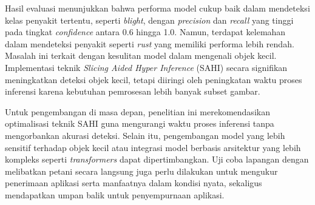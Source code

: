 \documentclass[journal,article,submit,pdftex,moreauthors]{Definitions/mdpi}
\begin{document}
Hasil evaluasi menunjukkan bahwa performa model cukup baik dalam mendeteksi kelas penyakit tertentu, seperti \textit{blight}, dengan \textit{precision} dan \textit{recall} yang tinggi pada tingkat \textit{confidence} antara 0.6 hingga 1.0. Namun, terdapat kelemahan dalam mendeteksi penyakit seperti \textit{rust} yang memiliki performa lebih rendah. Masalah ini terkait dengan kesulitan model dalam mengenali objek kecil. Implementasi teknik \textit{Slicing Aided Hyper Inference} (SAHI) secara signifikan meningkatkan deteksi objek kecil, tetapi diiringi oleh peningkatan waktu proses inferensi karena kebutuhan pemrosesan lebih banyak subset gambar.

Untuk pengembangan di masa depan, penelitian ini merekomendasikan optimalisasi teknik SAHI guna mengurangi waktu proses inferensi tanpa mengorbankan akurasi deteksi. Selain itu, pengembangan model yang lebih sensitif terhadap objek kecil atau integrasi model berbasis arsitektur yang lebih kompleks seperti \textit{transformers} dapat dipertimbangkan. Uji coba lapangan dengan melibatkan petani secara langsung juga perlu dilakukan untuk mengukur penerimaan aplikasi serta manfaatnya dalam kondisi nyata, sekaligus mendapatkan umpan balik untuk penyempurnaan aplikasi.
%

\end{document}

